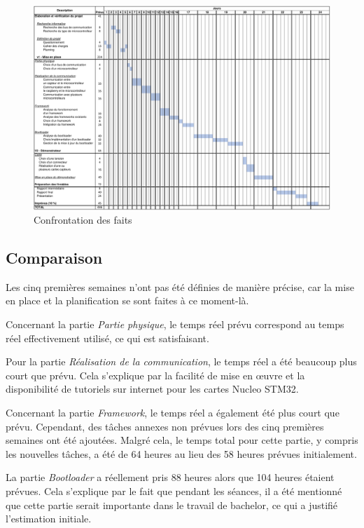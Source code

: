 \begin{figure}[H]
    \centering
    \includegraphics[angle=90,origin=c,scale=0.55]{./assets/files/planning_initial.pdf}
    \caption{Confrontation des faits}
\end{figure}

\newpage
\subsection{Comparaison}

Les cinq premières semaines n'ont pas été définies de manière précise, car la mise en place et la planification se sont faites à ce moment-là.

Concernant la partie \textit{Partie physique}, le temps réel prévu correspond au temps réel effectivement utilisé, ce qui est satisfaisant.

Pour la partie \textit{Réalisation de la communication}, le temps réel a été beaucoup plus court que prévu. Cela s'explique par la facilité de mise en œuvre et la disponibilité de tutoriels sur internet pour les cartes Nucleo STM32.

Concernant la partie \textit{Framework}, le temps réel a également été plus court que prévu. Cependant, des tâches annexes non prévues lors des cinq premières semaines ont été ajoutées. Malgré cela, le temps total pour cette partie, y compris les nouvelles tâches, a été de 64 heures au lieu des 58 heures prévues initialement.

La partie \textit{Bootloader} a réellement pris 88 heures alors que 104 heures étaient prévues. Cela s'explique par le fait que pendant les séances, il a été mentionné que cette partie serait importante dans le travail de bachelor, ce qui a justifié l'estimation initiale.

